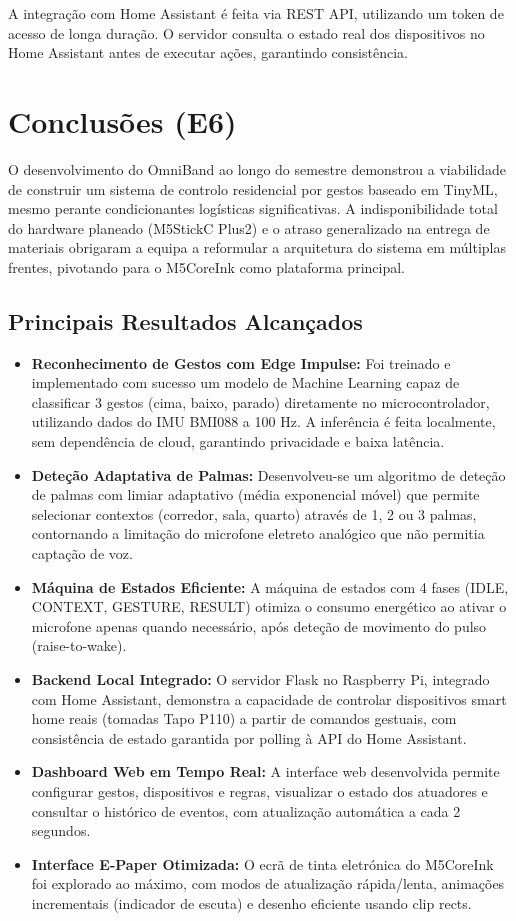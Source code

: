 \documentclass[11pt, a4paper]{article}
\begin{document}
A integração com Home Assistant é feita via REST API, utilizando um token de acesso de longa duração. O servidor consulta o estado real dos dispositivos no Home Assistant antes de executar ações, garantindo consistência.

\section{Conclusões (E6)}

O desenvolvimento do OmniBand ao longo do semestre demonstrou a viabilidade de construir um sistema de controlo residencial por gestos baseado em TinyML, mesmo perante condicionantes logísticas significativas. A indisponibilidade total do hardware planeado (M5StickC Plus2) e o atraso generalizado na entrega de materiais obrigaram a equipa a reformular a arquitetura do sistema em múltiplas frentes, pivotando para o M5CoreInk como plataforma principal.

\subsection{Principais Resultados Alcançados}

\begin{itemize}
    \item \textbf{Reconhecimento de Gestos com Edge Impulse:} Foi treinado e implementado com sucesso um modelo de Machine Learning capaz de classificar 3 gestos (cima, baixo, parado) diretamente no microcontrolador, utilizando dados do IMU BMI088 a 100 Hz. A inferência é feita localmente, sem dependência de cloud, garantindo privacidade e baixa latência.
    \item \textbf{Deteção Adaptativa de Palmas:} Desenvolveu-se um algoritmo de deteção de palmas com limiar adaptativo (média exponencial móvel) que permite selecionar contextos (corredor, sala, quarto) através de 1, 2 ou 3 palmas, contornando a limitação do microfone eletreto analógico que não permitia captação de voz.
    \item \textbf{Máquina de Estados Eficiente:} A máquina de estados com 4 fases (IDLE, CONTEXT, GESTURE, RESULT) otimiza o consumo energético ao ativar o microfone apenas quando necessário, após deteção de movimento do pulso (raise-to-wake).
    \item \textbf{Backend Local Integrado:} O servidor Flask no Raspberry Pi, integrado com Home Assistant, demonstra a capacidade de controlar dispositivos smart home reais (tomadas Tapo P110) a partir de comandos gestuais, com consistência de estado garantida por polling à API do Home Assistant.
    \item \textbf{Dashboard Web em Tempo Real:} A interface web desenvolvida permite configurar gestos, dispositivos e regras, visualizar o estado dos atuadores e consultar o histórico de eventos, com atualização automática a cada 2 segundos.
    \item \textbf{Interface E-Paper Otimizada:} O ecrã de tinta eletrónica do M5CoreInk foi explorado ao máximo, com modos de atualização rápida/lenta, animações incrementais (indicador de escuta) e desenho eficiente usando clip rects.
\end{itemize}
\end{document}
